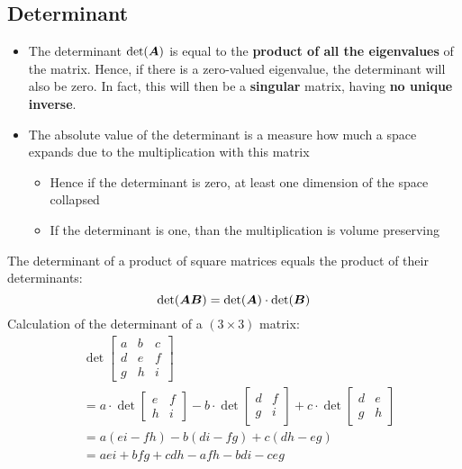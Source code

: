 \begin{multicols}{2}
	\subsection{Determinant}
	\begin{itemize}
		\item The determinant $\det(\bolA)$ is equal to the \textbf{product of all the eigenvalues} of the matrix.
		Hence, if there is a zero-valued eigenvalue, the determinant will also be zero. In fact, this will then be a \textbf{singular} matrix, having \textbf{no unique inverse}.
		\item The absolute value of the determinant is a measure how much a space expands due to the multiplication with this matrix
		\begin{itemize}
			\item Hence if the determinant is zero, at least one dimension of the space collapsed
			\item If the determinant is one, than the multiplication is volume preserving
		\end{itemize}
	\end{itemize}
	The determinant of a product of square matrices equals the product of their determinants:
	\[ \det(\bol{A}\bol{B}) = \det(\bolA)\cdot \det(\bol{B})  \]
	Calculation of the determinant of a $(3\times 3)$ matrix:
	\begin{align*}
	&\det \begin{bmatrix} a&b&c\\d&e&f\\g&h&i \end{bmatrix}\\
	&= a\cdot\det \begin{bmatrix} e&f\\h&i \end{bmatrix} -
	   b\cdot\det \begin{bmatrix} d&f\\g&i \end{bmatrix} +
	   c\cdot\det \begin{bmatrix} d&e\\g&h \end{bmatrix}\\
	&= a(ei-fh) - b(di-fg) + c(dh-eg)\\
	&= aei + bfg + cdh - afh - bdi - ceg
	\end{align*}
	
\end{multicols}
\newpage




